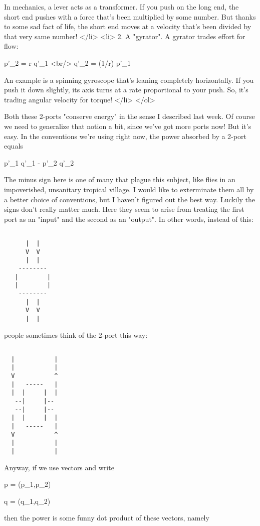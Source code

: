   In mechanics, a lever acts as a transformer.  If you push on the 
  long end, the short end pushes with a force that's been multiplied
  by some number.  But thanks to some sad fact of life, the short end
  moves at a velocity that's been divided by that very same number!
</li>
<li>
  2. A "gyrator".  A gyrator trades effort for flow:

  p'_{2} =    r    q'_{1} <br/>
  q'_{2} = (1/r) p'_{1}

  An example is a spinning gyroscope that's leaning completely 
  horizontally.  If you push it down slightly, its axis turns 
  at a rate proportional to your push.  So, it's trading angular
  velocity for torque!
</li>
</ol>

Both these 2-ports "conserve energy" in the sense I described last
week.  Of course we need to generalize that notion a bit, since we've 
got more ports now!  But it's easy.  In the conventions we're using
right now, the power absorbed by a 2-port equals

p'_{1} q'_{1} - p'_{2} q'_{2}

The minus sign here is one of many that plague this subject, like
flies in an impoverished, unsanitary tropical village.  I would like
to exterminate them all by a better choice of conventions, but I
haven't figured out the best way.  Luckily the signs don't really
matter much.  Here they seem to arise from treating the first port as
an "input" and the second as an "output".  
In other words, instead of this:


\begin{verbatim}

      |  |
      V  V
      |  |
    --------
   |        |
   |        |
    --------
      |  |
      V  V
      |  |
\end{verbatim}
    

people sometimes think of the 2-port this way:


\begin{verbatim}

  |           |
  |           |
  V           ^
  |   -----   |
  |  |     |  |
   --|     |--
   --|     |--
  |  |     |  |
  |   -----   |
  V           ^
  |           |
  |           |
\end{verbatim}
    

Anyway, if we use vectors and write 

p = (p_{1},p_{2})

q = (q_{1},q_{2})

then the power is some funny dot product of these vectors, namely

